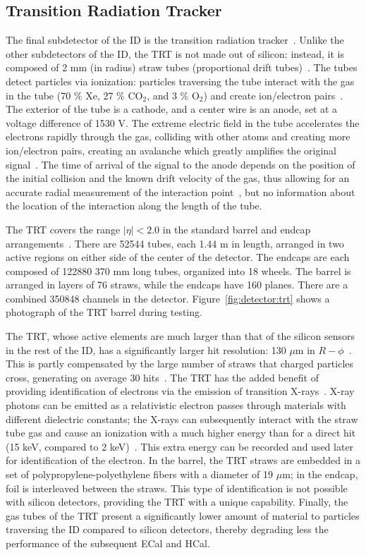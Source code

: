 \subsection{Transition Radiation Tracker}
\label{detector:ID:TRT}
The final subdetector of the ID is the transition radiation tracker~\cite{ATLASPaper}. Unlike the other subdetectors of the ID, the TRT is not made out of silicon: instead, it is composed of 2 mm (in radius) straw tubes (proportional drift tubes)~\cite{ATLASPaper}. The tubes detect particles via ionization: particles traversing the tube interact with the gas in the tube (70 $\%$ Xe, 27 \% CO$_2$, and 3 \% O$_2$) and create ion/electron pairs~\cite{Detectors,ATLASPaper}. The exterior of the tube is a cathode, and a center wire is an anode, set at a voltage difference of 1530 V. The extreme electric field in the tube accelerates the electrons rapidly through the gas, colliding with other atoms and creating more ion/electron pairs, creating an avalanche which greatly amplifies the original signal~\cite{Detectors}. The time of arrival of the signal to the anode depends on the position of the initial collision and the known drift velocity of the gas, thus allowing for an accurate radial measurement of the interaction point~\cite{TRTReadout}, but no information about the location of the interaction along the length of the tube.

The TRT covers the range $|\eta| < 2.0$ in the standard barrel and endcap arrangements~\cite{TRTPaper}. There are 52544 tubes, each 1.44 m in length, arranged in two active regions on either side of the center of the detector. The endcaps are each composed of 122880 370 mm long tubes, organized into 18 wheels. The barrel is arranged in layers of 76 straws, while the endcaps have 160 planes. There are a combined 350848 channels in the detector. Figure~\ref{fig:detector:trt} shows a photograph of the TRT barrel during testing.

The TRT, whose active elements are much larger than that of the silicon sensors in the rest of the ID, has a significantly larger hit resolution: 130 $\mu$m in $R-\phi$~\cite{ATLASPaper}. This is partly compensated by the large number of straws that charged particles cross, generating on average 30 hits~\cite{ATLASExpected}. The TRT has the added benefit of providing identification of electrons via the emission of transition X-rays~\cite{TRTPID}. X-ray photons can be emitted as a relativistic electron passes through materials with different dielectric constants; the X-rays can subsequently interact with the straw tube gas and cause an ionization with a much higher energy than for a direct hit (15 keV, compared to 2 keV)~\cite{TRTReadout}. This extra energy can be recorded and used later for identification of the electron. In the barrel, the TRT straws are embedded in a set of polypropylene-polyethylene fibers with a diameter of 19 $\mu$m; in the endcap, foil is interleaved between the straws. This type of identification is not possible with silicon detectors, providing the TRT with a unique capability. Finally, the gas tubes of the TRT present a significantly lower amount of material to particles traversing the ID compared to silicon detectors, thereby degrading less the performance of the subsequent ECal and HCal.

